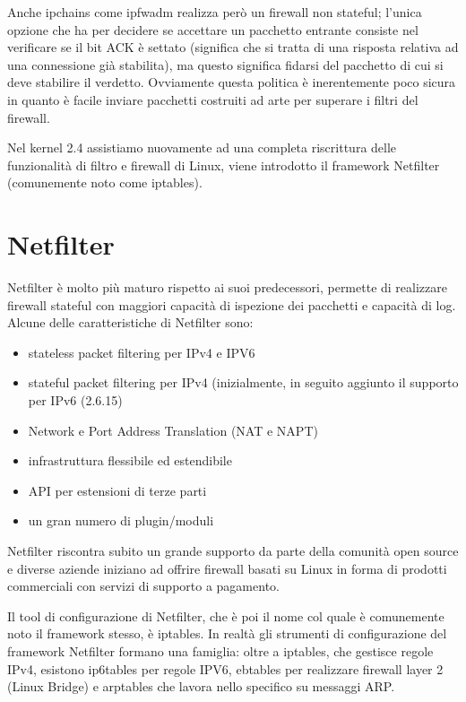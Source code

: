 Anche ipchains come ipfwadm realizza però un firewall non stateful; l'unica
opzione che ha per decidere se accettare un pacchetto entrante consiste nel
verificare se il bit ACK \`e settato (significa che si tratta di una risposta
relativa ad una connessione già stabilita), ma questo significa fidarsi del
pacchetto di cui si deve stabilire il verdetto.  Ovviamente questa politica è
inerentemente poco sicura in quanto è facile inviare pacchetti costruiti ad
arte per superare i filtri del firewall.

Nel kernel 2.4 assistiamo nuovamente ad una completa riscrittura delle
funzionalità di filtro e firewall di Linux, viene introdotto il framework 
Netfilter (comunemente noto come iptables).

\section{Netfilter}
Netfilter è molto più maturo rispetto ai suoi predecessori, permette di
realizzare firewall stateful con maggiori capacità di ispezione dei pacchetti
e capacità di log.
Alcune delle caratteristiche di Netfilter sono:

\begin{itemize}
    \item stateless packet filtering per IPv4 e IPV6
    \item stateful packet filtering per IPv4 (inizialmente, in seguito
        aggiunto il supporto per IPv6 (2.6.15)
    \item Network e Port Address Translation (NAT e NAPT)
    \item infrastruttura flessibile ed estendibile
    \item API per estensioni di terze parti
    \item un gran numero di plugin/moduli
\end{itemize}
Netfilter riscontra subito un grande supporto da parte della comunità open
source e diverse aziende iniziano ad offrire firewall basati su Linux in forma
di prodotti commerciali con servizi di supporto a pagamento.

Il tool di configurazione di Netfilter, che è poi il nome col quale è
comunemente noto il framework stesso, è iptables.
In realtà gli strumenti di configurazione del framework Netfilter formano una
famiglia: oltre a iptables, che gestisce regole IPv4, esistono ip6tables per
regole IPV6, ebtables per realizzare firewall layer 2 (Linux Bridge)
e arptables che lavora nello specifico su messaggi ARP.

